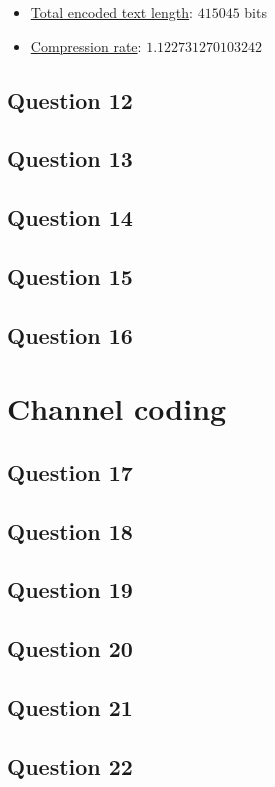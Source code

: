 \documentclass[]{template}
\begin{document}
    \begin{itemize}
        \item \underline{Total encoded text length}: $415045$ bits
        \item \underline{Compression rate}: $1.122731270103242$
    \end{itemize}

    \subsection{Question 12}

    \subsection{Question 13}

    \subsection{Question 14}

    \subsection{Question 15}

    \subsection{Question 16}

\section{Channel coding}

    \subsection{Question 17}

    \subsection{Question 18}

    \subsection{Question 19}

    \subsection{Question 20}

    \subsection{Question 21}

    \subsection{Question 22}
\end{document}
